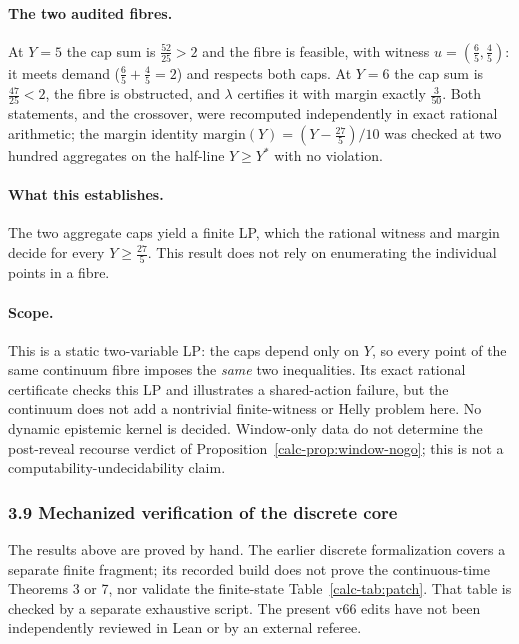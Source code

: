 \documentclass[10pt,twocolumn]{article}
\theoremstyle{definition}
\begin{document}
\paragraph{The two audited fibres.} At \(Y=5\) the cap sum is \(\tfrac{52}{25}>2\) and the
fibre is feasible, with witness \(u=(\tfrac65,\tfrac45)\): it meets demand
(\(\tfrac65+\tfrac45=2\)) and respects both caps. At \(Y=6\) the cap sum is
\(\tfrac{47}{25}<2\), the fibre is obstructed, and \(\lambda\) certifies it with margin
exactly \(\tfrac{3}{50}\). Both statements, and the crossover, were recomputed independently
in exact rational arithmetic; the margin identity
\(\mathrm{margin}(Y)=(Y-\tfrac{27}{5})/10\) was checked at two hundred aggregates on the
half-line \(Y\ge Y^{*}\) with no violation.

\paragraph{What this establishes.} The two aggregate caps yield a
finite LP, which the rational witness and margin decide for every
\(Y\ge\tfrac{27}{5}\). This result does not rely on enumerating the
individual points in a fibre.

\paragraph{Scope.} This is a static two-variable LP: the caps depend only on
\(Y\), so every point of the same continuum fibre imposes the \emph{same}
two inequalities. Its exact rational certificate checks this LP and
illustrates a shared-action failure, but the continuum does not add a
nontrivial finite-witness or Helly problem here. No dynamic epistemic
kernel is decided. Window-only data do not determine the post-reveal
recourse verdict of Proposition~\ref{calc-prop:window-nogo}; this is
not a computability-undecidability claim.

\subsubsection{3.9 Mechanized verification of the discrete core}
\label{calc-mech}

The results above are proved by hand. The earlier discrete formalization covers a separate finite fragment;
its recorded build does not prove the continuous-time Theorems 3 or 7,
nor validate the finite-state Table~\ref{calc-tab:patch}. That table is
checked by a separate exhaustive script. The present v66 edits have
not been independently reviewed in Lean or by an external referee.
\end{document}
